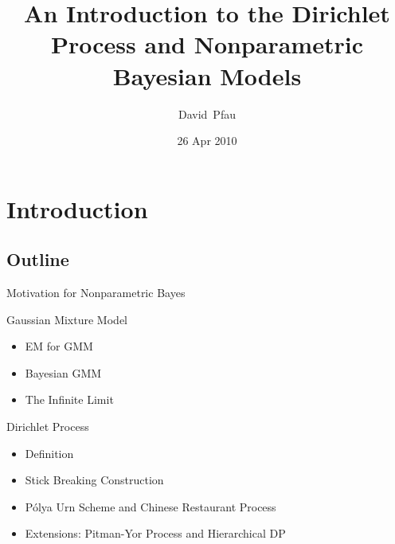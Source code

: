 \documentclass{beamer}
\title[An Introduction to the Dirichlet Process and Nonparametric Bayesian Models] 
{
	An Introduction to the Dirichlet Process and Nonparametric Bayesian Models
}
\author[Pfau]
{
  David~Pfau %
}
\institute[Columbia University]
{
  Columbia University
}
\date[26 April 2010]
{26 Apr 2010}
\begin{document}
\begin{frame}
	\titlepage
\end{frame}

\section{Introduction}
\subsection{Outline}
\begin{frame}
	\begin{block}{Motivation for Nonparametric Bayes}
	\end{block}
	\begin{block}{Gaussian Mixture Model}
		\begin{itemize}
			\item{EM for GMM}
			\item{Bayesian GMM}
			\item{The Infinite Limit}
		\end{itemize}
	\end{block}
	\begin{block}{Dirichlet Process}
		\begin{itemize}
			\item{Definition}
			\item{Stick Breaking Construction}
			\item{P\'{o}lya Urn Scheme and Chinese Restaurant Process}
			\item{Extensions: Pitman-Yor Process and Hierarchical DP}
		\end{itemize}
	\end{block}
\end{frame}
\end{document}
